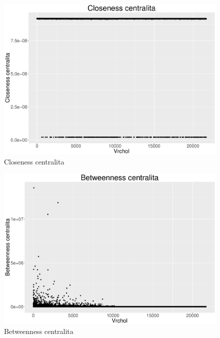 \documentclass[a4paper,12pt]{article}
\begin{document}
\begin{figure}[h!]
\centering
\includegraphics[scale=0.4]{images/closeness.pdf}
\caption{Closeness centralita}
\label{img:close}
\end{figure}

\begin{figure}[h!]
\centering
\includegraphics[scale=0.4]{images/betweenness.pdf}
\caption{Betweenness centralita}
\label{img:bc}
\end{figure}
\end{document}
